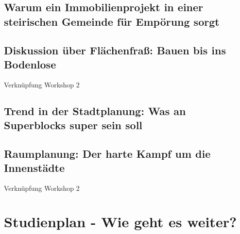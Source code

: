 \documentclass[]{article}
\begin{document}
\subsection{Warum ein Immobilienprojekt in einer steirischen Gemeinde für Empörung sorgt}

\subsection{Diskussion über Flächenfraß: Bauen bis ins Bodenlose}
Verknüpfung Workshop 2

\subsection{Trend in der Stadtplanung: Was an Superblocks super sein soll}

\subsection{Raumplanung: Der harte Kampf um die Innenstädte}
Verknüpfung Workshop 2

\section{Studienplan - Wie geht es weiter?}
\end{document}

